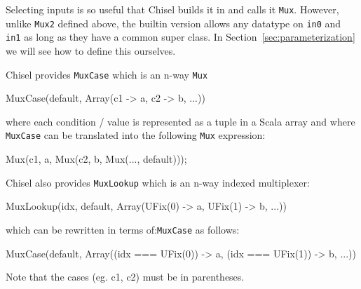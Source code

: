 \documentclass[10pt]{article}
\def\code#1{{\tt #1}}
\begin{document}
Selecting inputs is so useful that Chisel builds it in and calls it
\code{Mux}.  However, unlike \code{Mux2} defined above, the builtin version allows any datatype on
\code{in0} and \code{in1} as long as they have a common super class.
In Section~\ref{sec:parameterization} we will see how to define this
ourselves.

Chisel provides \code{MuxCase} which is an n-way \code{Mux} 
\begin{scala}
MuxCase(default, Array(c1 -> a, c2 -> b, ...))
\end{scala}
 
\noindent
where each condition / value is represented as a tuple in a Scala
array and where \code{MuxCase} can be translated into the following
\code{Mux} expression:

\begin{scala}
Mux(c1, a, Mux(c2, b, Mux(..., default)));
\end{scala}

\noindent
Chisel also provides \code{MuxLookup} which is an n-way indexed multiplexer:

\begin{scala}
MuxLookup(idx, default, Array(UFix(0) -> a, UFix(1) -> b, ...))
\end{scala}

\noindent
which can be rewritten in terms of:\verb+MuxCase+ as follows:

\begin{scala}
MuxCase(default, Array((idx === UFix(0)) -> a, (idx === UFix(1)) -> b, ...))
\end{scala}

\noindent
Note that the cases (eg. c1, c2) must be in parentheses.



%
%

\end{document}
